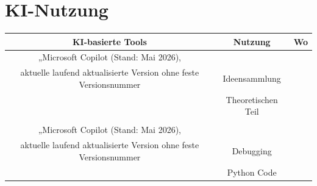 \section{KI-Nutzung}
\begin{tabular}{|c|c|c|}
    \hline
    KI-basierte Tools&Nutzung&Wo\\
    \hline
    „Microsoft Copilot (Stand: Mai 2026),\\
     aktuelle laufend aktualisierte Version ohne feste Versionsnummer&Ideensammlung\\&Theoretischen Teil\\\\
    \hline
    „Microsoft Copilot (Stand: Mai 2026), \\
    aktuelle laufend aktualisierte Version ohne feste Versionsnummer&Debugging\\&Python Code\\
    \hline

    
\end{tabular}
